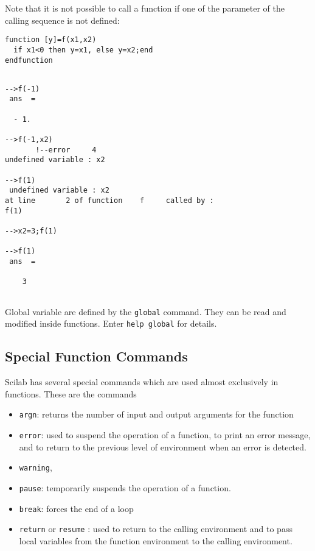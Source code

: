 Note that it is not possible to call a function if one of the
parameter of the calling sequence is not defined:

\begin{verbatim}
function [y]=f(x1,x2)
  if x1<0 then y=x1, else y=x2;end
endfunction
\end{verbatim}
\begin{verbatim}

-->f(-1)
 ans  =
 
  - 1.  
 
-->f(-1,x2)
       !--error     4 
undefined variable : x2  

-->f(1)
 undefined variable : x2                      
at line       2 of function    f     called by :  
f(1)

-->x2=3;f(1)

-->f(1)
 ans  =
 
    3
                    
\end{verbatim}

Global variable are defined by the \verb!global! command. They can
be read and modified inside functions. Enter {\tt help global} for
details. 

\subsection{Special Function Commands}
Scilab has several special commands which are used almost exclusively
in functions.  These are the commands 

\begin{itemize}
        \item {\tt argn}: returns the number of input
and output arguments for the function
        \item {\tt error}: used to suspend the 
operation of a function, to print an error message, and to return to the
previous level of environment when an error is detected.  
        \item {\tt warning}, 
        \item {\tt pause}: temporarily suspends the 
operation of a function.
        \item {\tt break}: forces the end of a loop 
        \item {\tt return} or {\tt resume} : used 
to return to the calling environment and to pass local
variables from the function environment to the calling environment.  
\end{itemize}

